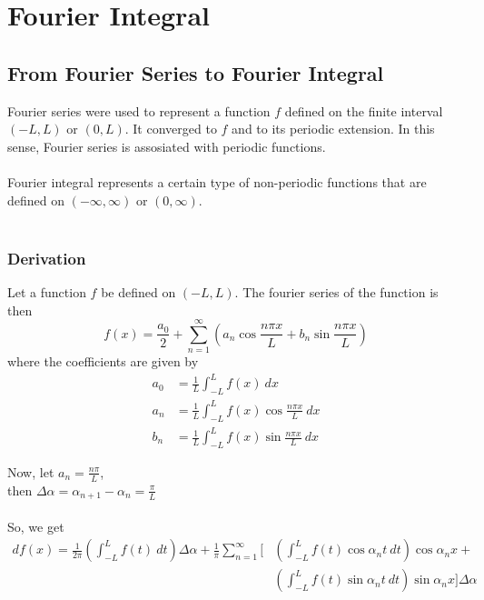\documentclass[12pt]{article}
\begin{document}

\section{Fourier Integral}

\subsection{From Fourier Series to Fourier Integral}
Fourier series were used to represent a function $f$ defined on the finite interval $(-L,L)$ or $(0,L)$. It converged to $f$ and to its periodic extension. In this sense, Fourier series is assosiated with periodic functions.\\~\\

Fourier integral represents a certain type of non-periodic functions that are defined on $(-\infty,\infty)$ or $(0,\infty)$.\\~\\

\subsubsection{Derivation}
Let a function $f$ be defined on $(-L,L)$. The fourier series of the function is then
\begin{equation}
    f(x) = \frac{a_0}{2} + \sum_{n=1}^{\infty} \left( a_n \cos{\frac{n\pi x}{L}} + b_n \sin{\frac{n\pi x}{L}} \right)
\end{equation}
where the coefficients are given by
\begin{align*}
    a_0 &= \frac{1}{L} \int_{-L}^{L} {f(x)} \: d{x} \\
    a_n &= \frac{1}{L} \int_{-L}^{L} {f(x) \cos{\frac{n\pi x}{L}}} \: d{x} \\
    b_n &= \frac{1}{L} \int_{-L}^{L} {f(x) \sin{\frac{n\pi x}{L}}} \: d{x}
\end{align*}

Now, let $\displaystyle a_n = \frac{n\pi}{L}$,\\
then $\displaystyle \Delta\alpha=\alpha_{n+1}-\alpha_n=\frac{\pi}{L}$\\~\\

So, we get
\begin{equation}
    \begin{split}
        d{f(x)} = \frac{1}{2\pi} \left( \int_{-L}^{L} {f(t)} \: d{t} \right) \Delta\alpha + \frac{1}{\pi} \sum_{n=1}^{\infty} \Bigg[ &\left( \int_{-L}^{L} {f(t) \cos{\alpha_n}t} \: d{t} \right) \cos{\alpha_n}x + \\
          &\left( \int_{-L}^{L} {f(t) \sin{\alpha_n}t} \: d{t} \right) \sin{\alpha_n}x \Bigg] \Delta\alpha
    \end{split}
\end{equation}
\end{document}
